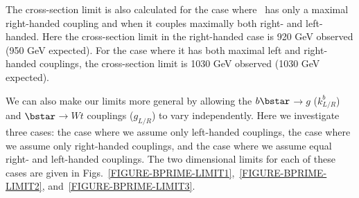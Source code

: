 
The cross-section limit is also calculated for the case where \bstar\ has only a maximal right-handed coupling and when it couples maximally both right- and left-handed. Here the cross-section limit in the right-handed case is 920 GeV observed (950 GeV expected). For the case where it has both maximal left and right-handed couplings, the cross-section limit is 1030 GeV observed (1030 GeV expected).

We can also make our limits more general by allowing the $b\bstar$$\to g$ ($k^b_{L/R}$) and $\bstar$$\to Wt$ couplings ($g_{L/R}$) to vary independently. Here we investigate three cases: the case where we assume only left-handed couplings, the case where we assume only right-handed couplings, and the case where we assume equal right- and left-handed couplings. The two dimensional limits for each of these cases are given in Figs.~\ref{FIGURE-BPRIME-LIMIT1},~\ref{FIGURE-BPRIME-LIMIT2}, and~\ref{FIGURE-BPRIME-LIMIT3}.
